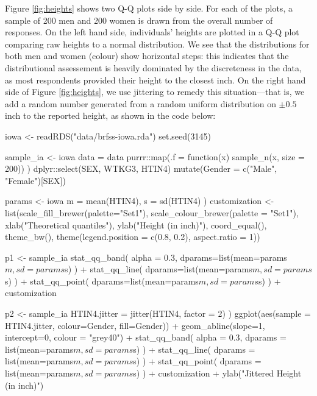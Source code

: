 Figure \ref{fig:heights} shows two Q-Q plots side by side. For each of
the plots, a sample of 200 men and 200 women is drawn from the overall
number of responses. On the left hand side, individuals' heights are
plotted in a Q-Q plot comparing raw heights to a normal distribution. We
see that the distributions for both men and women (colour) show
horizontal steps: this indicates that the distributional assessement is
heavily dominated by the discreteness in the data, as most respondents
provided their height to the closest inch. On the right hand side of
Figure \ref{fig:heights}, we use jittering to remedy this
situation---that is, we add a random number generated from a random
uniform distribution on \(\pm 0.5\) inch to the reported height, as
shown in the code below:

\begin{Schunk}
\begin{Sinput}
iowa <- readRDS("data/brfss-iowa.rda")
set.seed(3145)

sample_ia <- iowa %>% nest(-SEX) %>% mutate(
  data = data %>% 
    purrr::map(.f = function(x) sample_n(x, size = 200))  
) %>% unnest(data) %>% 
  dplyr::select(SEX, WTKG3, HTIN4) %>%
  mutate(Gender = c("Male", "Female")[SEX])

params <- iowa %>% filter(!is.na(HTIN4)) %>% summarize(
  m = mean(HTIN4),
  s = sd(HTIN4)
)
customization <- list(scale_fill_brewer(palette="Set1"),
  scale_colour_brewer(palette = "Set1"),
  xlab("Theoretical quantiles"),
  ylab("Height (in inch)"),
  coord_equal(),
  theme_bw(),
  theme(legend.position = c(0.8, 0.2), aspect.ratio = 1))

p1 <- sample_ia %>% ggplot(aes(sample = HTIN4, colour=Gender, fill=Gender)) + 
  stat_qq_band(
    alpha = 0.3, 
    dparams=list(mean=params$m, sd=params$s)
  ) + 
  stat_qq_line( 
    dparams=list(mean=params$m, sd=params$s)
  ) + 
  stat_qq_point( 
    dparams=list(mean=params$m, sd=params$s)
  ) +
  customization

p2 <- sample_ia %>% mutate(
    HTIN4.jitter = jitter(HTIN4, factor = 2)
    ) %>% 
  ggplot(aes(sample = HTIN4.jitter, colour=Gender, fill=Gender)) + 
  geom_abline(slope=1, intercept=0, colour = "grey40") +
  stat_qq_band(
    alpha = 0.3, 
    dparams = list(mean=params$m, sd=params$s)
  ) +
  stat_qq_line(
    dparams = list(mean=params$m, sd=params$s)
  ) + 
  stat_qq_point(
    dparams = list(mean=params$m, sd=params$s)
  ) +
  customization +
  ylab("Jittered Height (in inch)") 
\end{Sinput}
\end{Schunk}

